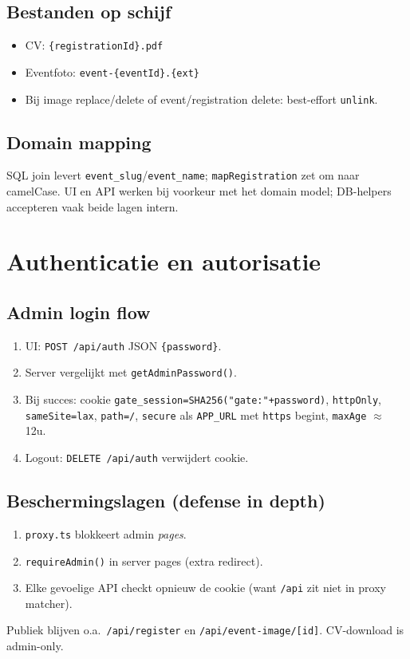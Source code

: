 \documentclass[11pt,a4paper]{report}
\begin{document}
\section{Bestanden op schijf}
\begin{itemize}[leftmargin=*]
  \item CV: \texttt{\{registrationId\}.pdf}
  \item Eventfoto: \texttt{event-\{eventId\}.\{ext\}}
  \item Bij image replace/delete of event/registration delete: best-effort \texttt{unlink}.
\end{itemize}

\section{Domain mapping}
SQL join levert \texttt{event\_slug}/\texttt{event\_name}; \texttt{mapRegistration} zet om naar camelCase.
UI en API werken bij voorkeur met het domain model; DB-helpers accepteren vaak beide lagen intern.

\chapter{Authenticatie en autorisatie}

\section{Admin login flow}
\begin{enumerate}[leftmargin=*]
  \item UI: \texttt{POST /api/auth} JSON \texttt{\{password\}}.
  \item Server vergelijkt met \texttt{getAdminPassword()}.
  \item Bij succes: cookie \texttt{gate\_session=SHA256("gate:"+password)},
        \texttt{httpOnly}, \texttt{sameSite=lax}, \texttt{path=/},
        \texttt{secure} als \texttt{APP\_URL} met \texttt{https} begint, \texttt{maxAge} $\approx$ 12u.
  \item Logout: \texttt{DELETE /api/auth} verwijdert cookie.
\end{enumerate}

\section{Beschermingslagen (defense in depth)}
\begin{enumerate}[leftmargin=*]
  \item \texttt{proxy.ts} blokkeert admin \emph{pages}.
  \item \texttt{requireAdmin()} in server pages (extra redirect).
  \item Elke gevoelige API checkt opnieuw de cookie (want \texttt{/api} zit niet in proxy matcher).
\end{enumerate}
Publiek blijven o.a.\ \texttt{/api/register} en \texttt{/api/event-image/[id]}.
CV-download is admin-only.
\end{document}
